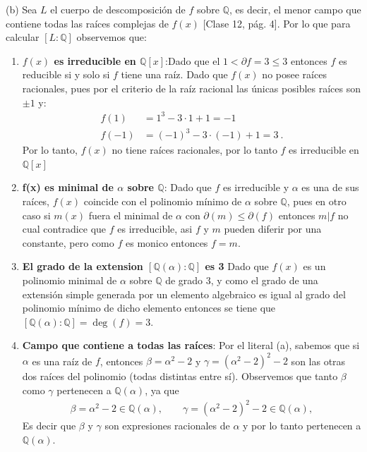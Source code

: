 \begin{solucion}
(b) Sea $L$ el cuerpo de descomposición de $f$ sobre $\mathbb{Q}$, es decir, el menor campo que contiene todas las raíces complejas de $f(x)$ [Clase 12, pág. 4]. Por lo que para calcular $[L:\mathbb{Q}]$ observemos que:
\begin{enumerate}
    \item \textbf{$f(x)$ es irreducible en $\mathbb Q[x]$}:Dado que el $1<\partial f=3\leq 3$ entonces $f$ es reducible si y solo si $f$ tiene una raíz. Dado que $f(x)$ no posee raíces racionales, pues por el criterio de la raíz racional las únicas posibles raíces son $\pm1$ y:
    \begin{align*}
        f(1) &= 1^3 - 3\cdot1 + 1 = -1 \\
        f(-1) &= (-1)^3 - 3\cdot(-1) + 1 = 3~.
    \end{align*}
    Por lo tanto, $f(x)$ no tiene raíces racionales, por lo tanto $f$ es irreducible en $\mathbb{Q}[x]$ 
	\item \textbf{f(x) es minimal de $\alpha$ sobre $\mathbb Q$}:  Dado que $f$ es irreducible y $\alpha$ es una de sus raíces, $f(x)$ coincide con el polinomio mínimo de $\alpha$ sobre $\mathbb{Q}$, pues en otro caso si $m(x)$ fuera el minimal de $\alpha$ con $\partial(m)\leq\partial(f)$ entonces $m|f$ no cual contradice que $f$ es irreducible, asi $f$ y $m$ pueden diferir por una constante, pero como $f$ es monico entonces $f=m$. 
    
    \item \textbf{El grado de la extension $[\mathbb Q(\alpha):\mathbb Q]$ es 3} Dado que $f(x)$ es un polinomio minimal de $\alpha$ sobre $\mathbb{Q}$ de grado $3$, y como el grado de una extensión simple generada por un elemento algebraico es igual al grado del polinomio mínimo de dicho elemento entonces se tiene que $[\mathbb{Q}(\alpha):\mathbb{Q}] = \deg(f) = 3$.

	\item \textbf{Campo que contiene a todas las raíces}:  Por el literal (a), sabemos que si $\alpha$ es una raíz de $f$, entonces $\beta = \alpha^2 - 2$ y $\gamma = (\alpha^2-2)^2 - 2$ son las otras dos raíces del polinomio (todas distintas entre sí). Observemos que tanto $\beta$ como $\gamma$ pertenecen a $\mathbb{Q}(\alpha)$, ya que
	\begin{align*}
        \beta = \alpha^2 - 2 \in \mathbb{Q}(\alpha), \qquad \gamma = (\alpha^2 - 2)^2 - 2 \in \mathbb{Q}(\alpha),
    \end{align*}
    Es decir que $\beta$ y $\gamma$ son expresiones racionales de $\alpha$ y por lo tanto pertenecen a $\mathbb{Q}(\alpha)$.
\end{enumerate}


\end{solucion}
